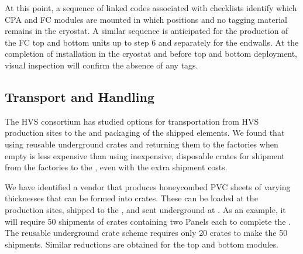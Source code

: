 At this point, %
a sequence of linked codes associated with  checklists %
identify which CPA and FC modules %
are mounted in %
which  positions and no tagging material remains in the cryostat.  A similar sequence is anticipated for the production of the FC top and bottom units up to step 6 and separately for the endwalls.  
At the completion of installation in the cryostat and before  top and bottom deployment, visual inspection will confirm the absence of any tags.

\subsection{Transport and Handling}
\label{sec:fdsp-hv-transport-transport}

The HVS consortium has studied %
options for %
transportation from HVS production sites %
to the  %
and packaging of the shipped elements. %
We found that using reusable underground 
crates and returning them to the factories when empty is less expensive than using inexpensive, disposable crates for shipment from the factories to the ,  
even with the extra shipment costs. %

We have identified a vendor that %
produces honeycombed PVC sheets of varying thicknesses that can be formed into crates. These %
can be loaded at the production sites, %
shipped to the , and sent underground at \surf.  
As an example, %
it will require 50 shipments of crates containing two  Panels each to complete the .  %
The reusable underground crate scheme requires only 20 crates to make the 50 shipments. Similar reductions are obtained for the top and bottom  modules. 

